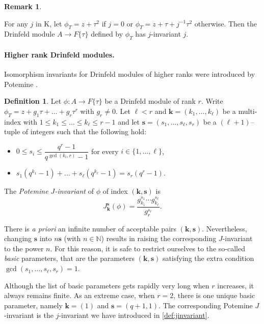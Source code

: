\documentclass[11pt]{article}
\theoremstyle{definition}
\newtheorem{definition}[theorem]{Definition}
\newtheorem{remark}[theorem]{Remark}
\renewcommand\leq{\leqslant}
\newcommand\N{\mathbb{N}}
\newcommand\bk{\boldsymbol{k}}
\newcommand\bs{\boldsymbol{s}}
\begin{document}
\begin{remark}
\label{rem:j-inv-representative}
  
  For any $j$ in K, let $\phi_T = z + \tau^2$ if $j=0$ or $\phi_T = z + \tau +
  j^{-1}\tau^2$ otherwise. Then the Drinfeld module $A \to F\{\tau\}$ defined
  by $\phi_T$ has $j$-invariant $j$.

\end{remark}


\paragraph{Higher rank Drinfeld modules.}

Isomorphism invariants for Drinfeld modules of higher
ranks were introduced by Potemine \cite{Potemine_1998}.

\begin{definition}
\label{def:jinvariants}
Let $\phi:A\to F\{\tau\}$ be a Drinfeld module of rank $r$. Write $\phi_T = z + g_1\tau+\dots+ g_r \tau^r$ with $g_r\neq 0$. 
Let $\ell < r$ and $\bk = (k_1, \ldots, k_\ell)$ be a multi-index with $1\leq k_1\leq\dots\leq k_\ell\leq r-1$ 
and let $\bs = (s_1,\dots,s_\ell, s_r)$ be a $(\ell{+}1)$--tuple of integers such that the following hold:
\begin{itemize}
\item $0\leq s_i \leq \dfrac{q^r-1}{q^{\gcd(k_i,r)}-1}$ for every $i\in\{1,\dots,\ell\}$,
\item $s_1\left(q^{k_1}-1\right)+\dots + s_\ell \left(q^{k_\ell}-1\right) = s_r\left(q^r-1\right)$.
\end{itemize}
The \emph{Potemine $J$-invariant} of $\phi$ of index $(\bk, \bs)$ is
\[J_{\bk}^{\bs}(\phi) = 
  \frac{g_{k_1}^{s_1} \cdots g_{k_\ell}^{s_\ell}}{g_r^{s_r}}.\]
\end{definition}

There is \emph{a priori} an infinite number of acceptable pairs $(\bk, \bs)$.
Nevertheless, changing $\bs$ into $n \bs$ (with $n \in \N$) results in
raising the corresponding $J$-invariant to the power $n$. For this reason,
it is safe to restrict ourselves to the so-called \emph{basic} parameters,
that are the parameters $(\bk, \bs)$ satisfying the extra condition $\gcd(s_1, \ldots, s_\ell, s_r) = 1$.

Although the list of basic parameters gets rapidly very long when $r$
increases, it always remains finite. As an extreme case, when $r = 2$,
there is one unique basic parameter, namely $\bk=(1)$ and $\bs = (q{+}1, 1)$. 
The corresponding Potemine $J$-invariant is the $j$-invariant we 
have introduced in \cref{def:jinvariant}.
\end{document}
